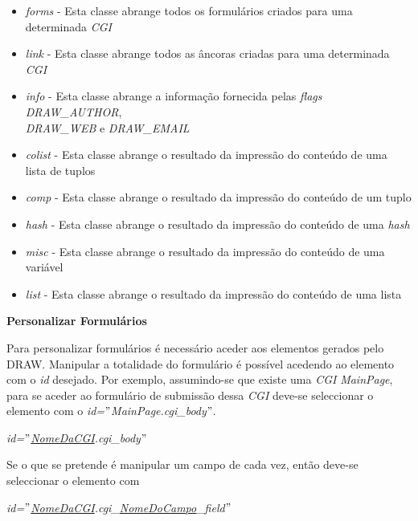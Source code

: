 \documentclass[a4paper]{article}
\begin{document}
\begin{itemize}
        \item \emph{forms} - Esta classe abrange todos os formulários criados para uma determinada \emph{CGI}
        \item \emph{link} - Esta classe abrange todos as âncoras criadas para uma determinada \emph{CGI}
        \item \emph{info} - Esta classe abrange a informação fornecida pelas \emph{flags} \emph{DRAW\_AUTHOR},\\
        \emph{DRAW\_WEB} e \emph{DRAW\_EMAIL}
        \item \emph{colist} - Esta classe abrange o resultado da impressão do conteúdo de uma lista de tuplos
        \item \emph{comp} - Esta classe abrange o resultado da impressão do conteúdo de um tuplo
        \item \emph{hash} - Esta classe abrange o resultado da impressão do conteúdo de uma \emph{hash}
        \item \emph{misc} - Esta classe abrange o resultado da impressão do conteúdo de uma variável
        \item \emph{list} - Esta classe abrange o resultado da impressão do conteúdo de uma lista
\end{itemize}

\begin{normalsize}
\textbf{Personalizar Formulários}\\
\end{normalsize}

\hspace{1cm}Para personalizar formulários é necessário aceder aos elementos gerados pelo DRAW. Manipular a totalidade do formulário é
possível acedendo ao elemento com o \emph{id} desejado. Por exemplo, assumindo-se que existe uma \emph{CGI} \emph{MainPage}, para se
aceder ao formulário de submissão dessa \emph{CGI} deve-se seleccionar o elemento com o \emph{id=$"$MainPage.cgi\_body$"$}.

\begin{center}
\emph{id=$"$\underline{NomeDaCGI}.cgi\_body$"$}
\end{center}

\hspace{1cm}Se o que se pretende é manipular um campo de cada vez, então deve-se seleccionar o elemento com

\begin{center}
\emph{id=$"$\underline{NomeDaCGI}.cgi\_\underline{NomeDoCampo}\_field$"$}
\end{center}
\end{document}
